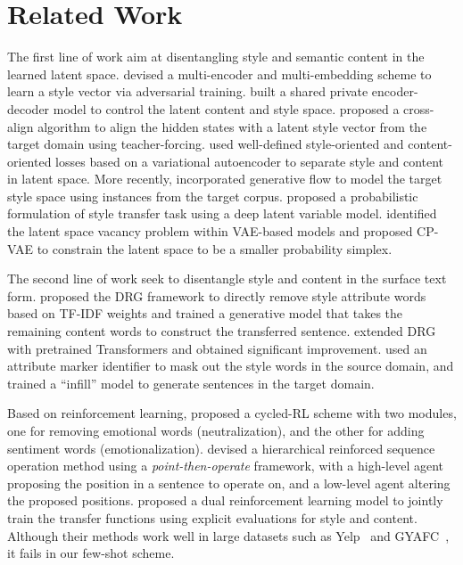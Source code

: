 \section{Related Work}
\label{sec:related}
The first line of work aim at disentangling style and semantic content in the learned latent space. \citet{fu2018style} devised a multi-encoder and multi-embedding scheme to learn a style vector via adversarial training. \citet{zhang2018shaped} built a shared private encoder-decoder model to control the latent content and style space. \citet{shen2017style} proposed a cross-align algorithm to align the hidden states with a latent style vector from the target domain using teacher-forcing.  \citet{john2018disentangled} used well-defined style-oriented and content-oriented losses based on a variational autoencoder to separate style and content in latent space. More recently, \citet{Yi2019} incorporated generative flow to model the target style space using instances from the target corpus. \citet{he2020probabilistic} proposed a probabilistic formulation of style transfer task using a deep latent variable model. \citet{DBLP:journals/corr/abs-1905-11975} identified the latent space vacancy problem within VAE-based models and proposed CP-VAE to constrain the latent space to be a smaller probability simplex.

The second line of work seek to disentangle style and content in the surface text form. \citet{li2018delete} proposed the DRG framework to directly remove style attribute words based on TF-IDF weights and trained a generative model that takes the remaining content words to construct the transferred sentence. \citet{Sudhakar2020} extended DRG with pretrained Transformers and obtained significant improvement. \citet{wu2019mask} used an attribute marker identifier to mask out the style words in the source domain, and trained a ``infill'' model to generate sentences in the target domain.

Based on reinforcement learning, \citet{xu2018unpaired} proposed a cycled-RL scheme with two modules, one for removing emotional words (neutralization), and the other for adding sentiment words (emotionalization). \citet{wu2019hierarchical} devised a hierarchical reinforced sequence operation method using a \emph{point-then-operate} framework, with a high-level agent proposing the position in a sentence to operate on, and a low-level agent altering the proposed positions. \citet{luo2019dual} proposed a dual reinforcement learning model to jointly train the transfer functions using explicit evaluations for style and content. Although their methods work well in large datasets such as Yelp~\citep{asghar2016yelp} and GYAFC~\citep{rao2018dear}, it fails in our few-shot scheme.

